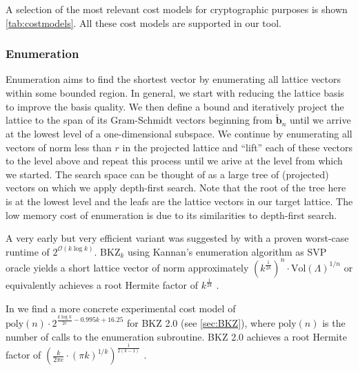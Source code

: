 A selection of the most relevant cost models for cryptographic purposes is shown \cref{tab:costmodels}. All these cost models are supported in our tool.


\subsubsection{Enumeration} \label{sec:enumeration}%
Enumeration aims to find the shortest vector by enumerating all lattice vectors within some bounded region. In general, we start with reducing the lattice basis to improve the basis quality. We then define a bound and iteratively project the lattice to the span of its Gram-Schmidt vectors beginning from $\tilde{\mathbf{b}}_n$ until we arrive at the lowest level of a one-dimensional subspace. We continue by enumerating all vectors of norm less than $r$ in the projected lattice and ``lift'' each of these vectors to the level above and repeat this process until we arive at the level from which we started. The search space can be thought of as a large tree of (projected) vectors on which we apply depth-first search. Note that the root of the tree here is at the lowest level and the leafs are the lattice vectors in our target lattice. %
The low memory cost of enumeration is due to its similarities to depth-first search.

A very early but very efficient variant was suggested by \citet{Kan83} with a proven worst-case runtime of $2^{\mathcal{O}(k \log k)}$. BKZ$_k$ using Kannan's enumeration algorithm as SVP oracle yields a short lattice vector of norm approximately $\left(k^{\frac{1}{2k}}\right)^n\cdot \text{Vol}(\Lambda)^{1/n}$ or equivalently achieves a root Hermite factor of $k^{\frac{1}{2k}}$ \cite{HS07, ABFKSW20}. %

In \cite{ABFKSW20} we find a more concrete experimental cost model of $\text{poly}(n) \cdot 2^{\frac{k \log k}{2e}  - 0.995 k + 16.25}$ for BKZ 2.0 (see \cref{sec:BKZ}), where $\text{poly}(n)$ is the number of calls to the enumeration subroutine. BKZ 2.0 achieves a  root Hermite factor of $\left(\frac{k}{2\pi e} \cdot (\pi k)^{1/k}\right)^{\frac{1}{2(k-1)}}$ \cite{Chen13}.

